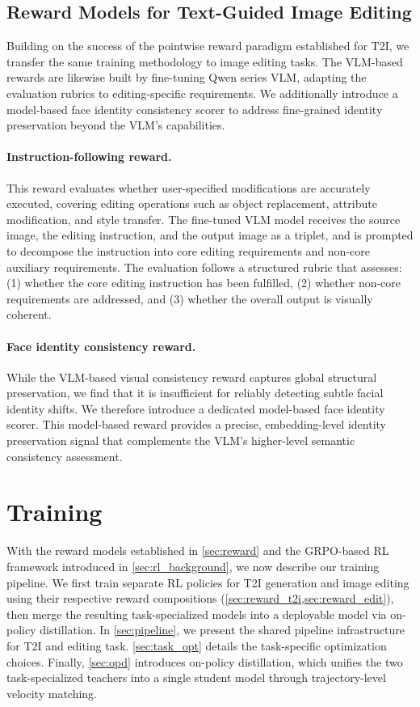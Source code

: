 \documentclass{article} %
\begin{document}
\subsection{Reward Models for Text-Guided Image Editing}
\label{sec:reward_edit}

Building on the success of the pointwise reward paradigm established for T2I, we transfer the same training methodology to image editing tasks. The VLM-based rewards are likewise built by fine-tuning Qwen series VLM, adapting the evaluation rubrics to editing-specific requirements. We additionally introduce a model-based face identity consistency scorer to address fine-grained identity preservation beyond the VLM's capabilities.

\paragraph{Instruction-following reward.} This reward evaluates whether user-specified modifications are accurately executed, covering editing operations such as object replacement, attribute modification, and style transfer. The fine-tuned VLM model receives the source image, the editing instruction, and the output image as a triplet, and is prompted to decompose the instruction into core editing requirements and non-core auxiliary requirements. The evaluation follows a structured rubric that assesses: (1) whether the core editing instruction has been fulfilled, (2) whether non-core requirements are addressed, and (3) whether the overall output is visually coherent.


\paragraph{Face identity consistency reward.} While the VLM-based visual consistency reward captures global structural preservation, we find that it is insufficient for reliably detecting subtle facial identity shifts. We therefore introduce a dedicated model-based face identity scorer. This model-based reward provides a precise, embedding-level identity preservation signal that complements the VLM's higher-level semantic consistency assessment.



\section{Training}
\label{sec:training}

With the reward models established in \cref{sec:reward} and the GRPO-based RL framework introduced in \cref{sec:rl_background}, we now describe our training pipeline. We first train separate RL policies for T2I generation and image editing using their respective reward compositions (\cref{sec:reward_t2i,sec:reward_edit}), then merge the resulting task-specialized models into a deployable model via on-policy distillation. In \cref{sec:pipeline}, we present the shared pipeline infrastructure for T2I and editing task. \cref{sec:task_opt} details the task-specific optimization choices. Finally, \cref{sec:opd} introduces on-policy distillation, which unifies the two task-specialized teachers into a single student model through trajectory-level velocity matching.
\end{document}
